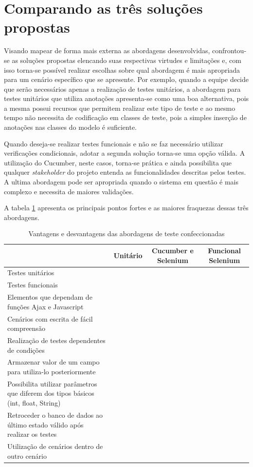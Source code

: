 \documentclass[tg]{mdtufsm}
\begin{document}
\section{Comparando as três soluções propostas}
Visando mapear de forma mais externa as abordagens desenvolvidas, confrontou-se as soluções propostas elencando suas respectivas virtudes e limitações e, com isso torna-se possível realizar escolhas sobre qual abordagem é mais apropriada para um cenário específico que se apresente.
Por exemplo, quando a equipe decide que serão necessários apenas a realização de testes unitários, a abordagem para testes unitários que utiliza anotações apresenta-se como uma boa alternativa, pois a mesma possui recursos que permitem realizar este tipo de teste e ao mesmo tempo não necessita de codificação em classes de teste, pois a simples inserção de anotações nas classes do modelo é suficiente.

Quando deseja-se realizar testes funcionais e não se faz necessário utilizar verificações condicionais, adotar a segunda solução torna-se uma opção válida. A utilização do Cucumber, neste casos, torna-se prática e ainda possibilita que qualquer \emph{stakeholder} do projeto entenda as funcionalidades descritas pelos testes.
A ultima abordagem pode ser apropriada quando o sistema em questão é mais complexo e necessita de maiores validações.

A tabela \ref{tab:comparacaoSolucoes} apresenta os principais pontos fortes e as maiores fraquezas dessas três abordagens.

\begin{table}[!htpb]
	\centering
	\begin{tabular}{p{5cm}|ccc}
		& Unitário & Cucumber e Selenium & Funcional Selenium\\ \hline
		Testes unitários & \checkmark & \checkmark & \checkmark \\ \hline
		Testes funcionais &  & \checkmark & \checkmark \\ \hline
		Elementos que dependam de funções Ajax e Javascript & & \checkmark & \checkmark \\ \hline
		Cenários com escrita de fácil compreensão & & \checkmark & \\ \hline
		Realização de testes dependentes de condições & & & \checkmark \\ \hline
		Armazenar valor de um campo para utiliza-lo posteriormente & & & \checkmark \\ \hline
		Possibilita utilizar parâmetros que diferem dos tipos básicos (int, float, String) & \checkmark & & \checkmark \\ \hline
		Retroceder o banco de dados ao último estado válido após realizar os testes & & & \\ \hline
		Utilização de cenários dentro de outro cenário & & & \checkmark \\
	\end{tabular}
	\caption{Vantagens e desvantagens das abordagens de teste confeccionadas}
	\label{tab:comparacaoSolucoes}
\end{table}
\end{document}
